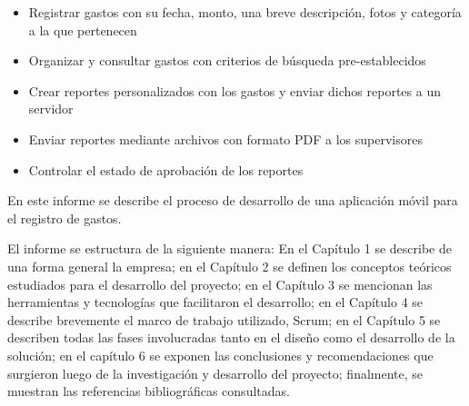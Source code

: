 \begin{itemize}
\item Registrar gastos con su fecha, monto, una breve descripción, fotos y categoría a la que pertenecen
\item Organizar y consultar gastos con criterios de búsqueda pre-establecidos
\item Crear reportes personalizados con los gastos y enviar dichos reportes a un servidor
\item Enviar reportes mediante archivos con formato PDF a los supervisores
\item Controlar el estado de aprobación de los reportes
\end{itemize}

En este informe se describe el proceso de desarrollo de una aplicación móvil para el registro de gastos.

El informe se estructura de la siguiente manera: En el Capítulo 1 se describe de una forma general la empresa; en el Capítulo 2 se definen los conceptos teóricos estudiados para el desarrollo del proyecto; en el Capítulo 3 se mencionan las herramientas y tecnologías que facilitaron el desarrollo; en el Capítulo 4 se describe brevemente el marco de trabajo utilizado, Scrum; en el Capítulo 5 se describen todas las fases involucradas tanto en el diseño como el desarrollo de la solución; en el capítulo 6 se exponen las conclusiones y recomendaciones que surgieron luego de la investigación y desarrollo del proyecto; finalmente, se muestran las referencias bibliográficas consultadas.